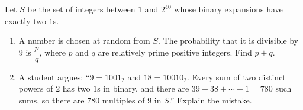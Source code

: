 Let $S$ be the set of integers between $1$ and $2^{40}$ whose binary expansions have exactly two $1$s.
\begin{enumerate}
\item[(a)] A number is chosen at random from $S$. The probability that it is divisible by $9$ is $\dfrac {p}{q}$, where $p$ and $q$ are relatively prime positive integers. Find $p+q$.
\item[(b)] A student argues: ``$9=1001_2$ and $18=10010_2$. Every sum of two distinct powers of $2$ has two $1$s in binary, and there are $39+38+\cdots+1=780$ such sums, so there are $780$ multiples of $9$ in $S$.'' Explain the mistake.
\end{enumerate}
